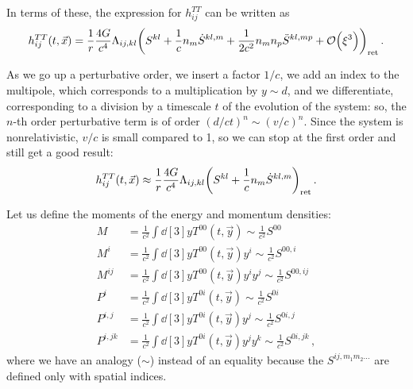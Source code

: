 \documentclass[main.tex]{subfiles}
\begin{document}
In terms of these, the expression for \(h_{ij}^{TT}\) can be written as 
%
\begin{align}
h_{ij}^{TT} (t, \vec{x}) = \frac{1}{r} \frac{4G}{c^{4}} \Lambda_{ij, kl} 
\qty(S^{kl} + \frac{1}{c} n_{m} \dot{S}^{kl, m} + \frac{1}{2 c^2} n_m n_p \ddot{S}^{kl, mp} + \order{\xi^3})_{\text{ret}}
\,.
\end{align}

As we go up a perturbative order, we insert a factor \(1/c\), we add an index to the multipole, which corresponds to a multiplication by \(y \sim d\), and we differentiate, corresponding to a division by a timescale \(t\) of the evolution of the system: so, the \(n\)-th order perturbative term is of order \((d/ct)^{n} \sim (v/c)^{n}\).
Since the system is nonrelativistic, \(v/c\) is small compared to 1, so we can stop at the first order and still get a good result:
%
\begin{align}
h_{ij}^{TT} (t, \vec{x}) \approx \frac{1}{r} \frac{4G}{c^{4}}
\Lambda_{ij, kl} \qty( S^{kl} + \frac{1}{c} n_m \dot{S}^{kl, m})_{\text{ret}}
\,.
\end{align}

Let us define the moments of the energy and momentum densities: 
%
\begin{align}
M &= \frac{1}{c^2} \int \dd[3]{y} T^{00}(t, \vec{y}) \sim \frac{1}{c^2} S^{00} \\ 
M^{i} &= \frac{1}{c^2} \int \dd[3]{y} T^{00}(t, \vec{y})y^{i} \sim \frac{1}{c^2} S^{00,i} \\ 
M^{ij} &= \frac{1}{c^2} \int \dd[3]{y} T^{00}(t, \vec{y})y^{i}y^{j} \sim \frac{1}{c^2} S^{00,ij} \\ 
P^{i} &= \frac{1}{c^2} \int \dd[3]{y} T^{0i} (t, \vec{y}) \sim \frac{1}{c^2} S^{0i} \\  
P^{i,j} &= \frac{1}{c^2} \int \dd[3]{y} T^{0i} (t, \vec{y}) y^{j} \sim \frac{1}{c^2} S^{0i,j} \\  
P^{i,jk} &= \frac{1}{c^2} \int \dd[3]{y} T^{0i} (t, \vec{y}) y^{j}y^{k} \sim \frac{1}{c^2} S^{0i,jk}
\,,
\end{align}
%
where we have an analogy (\(\sim\)) instead of an equality because the \(S^{ij,m_1 m_2 \dots}\) are defined only with spatial indices. 
\end{document}
